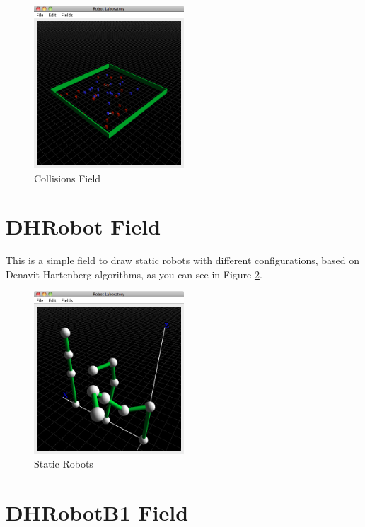 \documentclass[12pt,a4paper,oneside,english]{book}
\begin{document}
\begin{figure}[htbp]
\begin{center}
\includegraphics[width=0.5\textwidth]{images/CF.png}
\caption{Collisions Field}
\label{collisions field}
\end{center}
\end{figure}

\newpage
\section{DHRobot Field}

This is a simple field to draw static robots with different configurations, based on Denavit-Hartenberg algorithms, as you can see in Figure \ref{static robots}.

\begin{figure}[htbp]
\begin{center}
\includegraphics[width=0.5\textwidth]{images/SR.png}
\caption{Static Robots}
\label{static robots}
\end{center}
\end{figure}

\newpage
\section{DHRobotB1 Field}
\end{document}
